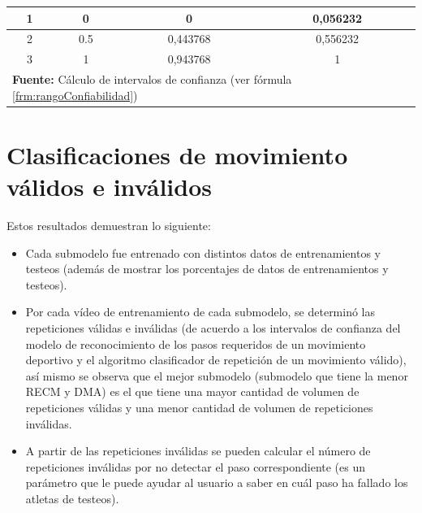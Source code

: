 \begin{table}[H]
\begin{center}
\begin{tabular}{cccc}
\multicolumn{1}{|c|}{1} & \multicolumn{1}{c|}{0} & \multicolumn{1}{c|}{0} & \multicolumn{1}{c|}{0,056232} \\ \hline
\multicolumn{1}{|c|}{2} & \multicolumn{1}{c|}{0.5} & \multicolumn{1}{c|}{0,443768} & \multicolumn{1}{c|}{0,556232} \\ \hline
\multicolumn{1}{|c|}{3} & \multicolumn{1}{c|}{1} & \multicolumn{1}{c|}{0,943768} & \multicolumn{1}{c|}{1} \\ \hline
\multicolumn{4}{l}{\textbf{Fuente:} C\'alculo de intervalos de confianza (ver f\'ormula \ref{frm:rangoConfiabilidad})}
\end{tabular}
\end{center}
\end{table}
\section{Clasificaciones de movimiento v\'alidos e inv\'alidos} \label{res:clasiMov}
Estos resultados demuestran lo siguiente:
\begin{itemize}
\item  Cada submodelo fue entrenado con distintos datos de entrenamientos y testeos (adem\'as de mostrar los porcentajes de datos de entrenamientos y testeos).
\item Por cada v\'ideo de entrenamiento de cada submodelo, se determin\'o  las repeticiones v\'alidas e inv\'alidas (de acuerdo a los intervalos de confianza del modelo de reconocimiento de los pasos requeridos de un movimiento deportivo  y el algoritmo clasificador de repetici\'on de un movimiento v\'alido), as\'i mismo se observa que el mejor submodelo (submodelo que tiene la menor RECM y DMA) es el que tiene una mayor cantidad de volumen de repeticiones v\'alidas y una menor cantidad de volumen de repeticiones inv\'alidas.
\item A partir de las repeticiones inv\'alidas se pueden calcular el n\'umero de repeticiones inv\'alidas por no detectar el paso correspondiente (es un par\'ametro que le puede ayudar al usuario a saber en cu\'al paso ha fallado los atletas de testeos). 
\end{itemize}
